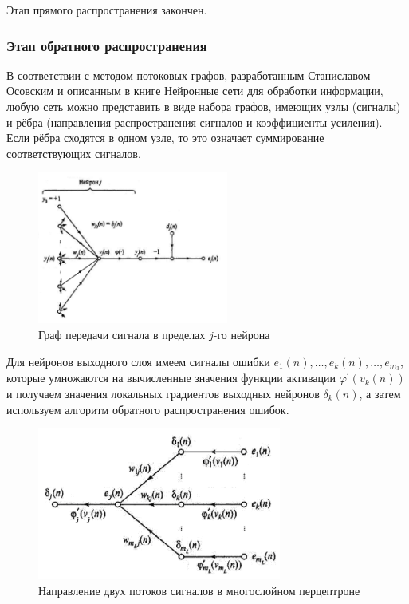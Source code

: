 \documentclass{article}
\begin{document}
Этап прямого распространения закончен.




\subsubsection{Этап обратного распространения}

В соответствии с методом потоковых графов, разработанным Станиславом Осовским и описанным в книге \glqq Нейронные сети для обработки информации\grqq,
любую сеть можно представить в виде набора графов, имеющих узлы (сигналы) и рёбра (направления распространения сигналов и коэффициенты усиления).
Если рёбра сходятся в одном узле, то это означает суммирование соответствующих сигналов.

\begin{figure}[H]
    \centering
    \includegraphics[height=5cm]{lec_neuro_08_4_3.png}
    \caption{Граф передачи сигнала в пределах $j$-го нейрона}
    \label{lec_neuro_08_4_3}
\end{figure}

Для нейронов выходного слоя имеем сигналы ошибки $e_1(n),\dots,e_k(n),\dots,e_{m_3}$, которые 
умножаются на вычисленные значения функции активации $\varphi^{\prime}(v_k(n))$ и получаем значения локальных градиентов 
выходных нейронов $\delta_k(n)$, а затем используем алгоритм обратного распространения ошибок.

\begin{figure}[H]
    \centering
    \includegraphics[height=5cm]{lec_neuro_08_4_5.png}
    \caption{Направление двух потоков сигналов в многослойном перцептроне}
    \label{lec_neuro_08_4_5}
\end{figure}
\end{document}

